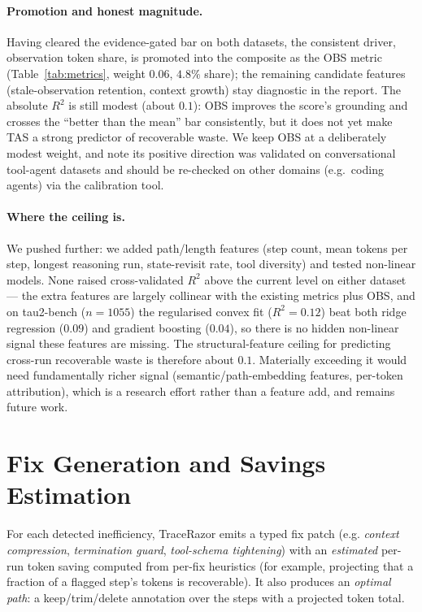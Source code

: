 \documentclass[11pt]{article}
\begin{document}
\paragraph{Promotion and honest magnitude.} Having cleared the evidence-gated bar
on both datasets, the consistent driver, observation token share, is promoted
into the composite as the OBS metric (Table~\ref{tab:metrics}, weight $0.06$,
$4.8\%$ share); the remaining candidate features (stale-observation retention,
context growth) stay diagnostic in the report. The absolute $R^2$ is still modest
(about $0.1$): OBS improves the score's grounding and crosses the ``better than
the mean'' bar consistently, but it does not yet make TAS a strong predictor of
recoverable waste. We keep OBS at a deliberately modest weight, and note its
positive direction was validated on conversational tool-agent datasets and should
be re-checked on other domains (e.g.\ coding agents) via the calibration tool.

\paragraph{Where the ceiling is.} We pushed further: we added path/length
features (step count, mean tokens per step, longest reasoning run, state-revisit
rate, tool diversity) and tested non-linear models. None raised cross-validated
$R^2$ above the current level on either dataset --- the extra features are largely
collinear with the existing metrics plus OBS, and on tau2-bench ($n{=}1055$) the
regularised convex fit ($R^2 = 0.12$) beat both ridge regression ($0.09$) and
gradient boosting ($0.04$), so there is no hidden non-linear signal these
features are missing. The structural-feature ceiling for predicting cross-run
recoverable waste is therefore about $0.1$. Materially exceeding it would need
fundamentally richer signal (semantic/path-embedding features, per-token
attribution), which is a research effort rather than a feature add, and remains
future work.

\section{Fix Generation and Savings Estimation}
\label{sec:fixes}
For each detected inefficiency, TraceRazor emits a typed fix patch
(e.g. \emph{context compression}, \emph{termination guard},
\emph{tool-schema tightening}) with an \emph{estimated} per-run token saving
computed from per-fix heuristics (for example, projecting that a fraction of a
flagged step's tokens is recoverable). It also produces an \emph{optimal path}:
a keep/trim/delete annotation over the steps with a projected token total.
\end{document}

